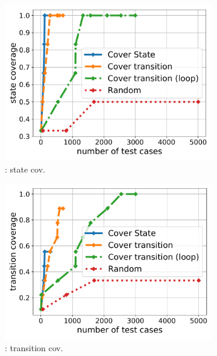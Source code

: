 \begin{figure}[t]
	\centering
	
	\begin{subfigure}[b]{0.47\columnwidth}
		\includegraphics[width=\columnwidth]{Figures/Chapter3/CMA-state-coverage.pdf}
		\caption{\wecredit: state cov.}
		\label{fig:cma-state}
	\end{subfigure}
	\begin{subfigure}[b]{0.47\columnwidth}
		\includegraphics[width=\columnwidth]{Figures/Chapter3/CMA-transition-coverage.pdf}
		\caption{\wecredit: transition cov.}
		\label{fig:cma-transition}
	\end{subfigure}
	\begin{subfigure}[b]{0.47\columnwidth}

\end{subfigure}
\end{figure}
